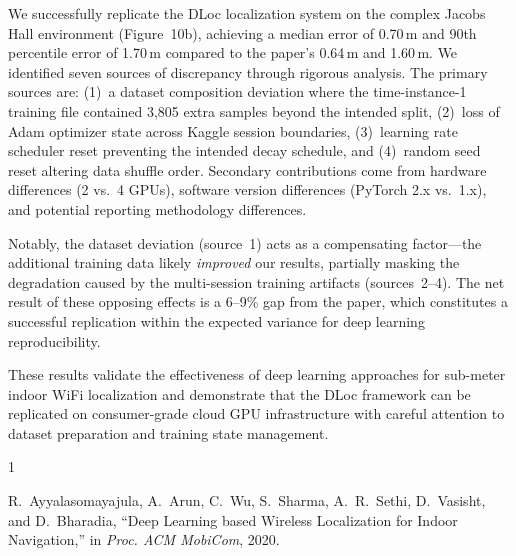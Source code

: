 \documentclass[12pt,a4paper]{article}
\begin{document}
We successfully replicate the DLoc localization system on the complex Jacobs Hall environment (Figure~10b), achieving a median error of 0.70\,m and 90th percentile error of 1.70\,m compared to the paper's 0.64\,m and 1.60\,m. We identified seven sources of discrepancy through rigorous analysis. The primary sources are: (1)~a dataset composition deviation where the time-instance-1 training file contained 3{,}805 extra samples beyond the intended split, (2)~loss of Adam optimizer state across Kaggle session boundaries, (3)~learning rate scheduler reset preventing the intended decay schedule, and (4)~random seed reset altering data shuffle order. Secondary contributions come from hardware differences (2 vs.\ 4 GPUs), software version differences (PyTorch 2.x vs.\ 1.x), and potential reporting methodology differences.

Notably, the dataset deviation (source~1) acts as a compensating factor---the additional training data likely \emph{improved} our results, partially masking the degradation caused by the multi-session training artifacts (sources~2--4). The net result of these opposing effects is a 6--9\% gap from the paper, which constitutes a successful replication within the expected variance for deep learning reproducibility.

These results validate the effectiveness of deep learning approaches for sub-meter indoor WiFi localization and demonstrate that the DLoc framework can be replicated on consumer-grade cloud GPU infrastructure with careful attention to dataset preparation and training state management.

\begin{thebibliography}{1}

R.~Ayyalasomayajula, A.~Arun, C.~Wu, S.~Sharma, A.~R.~Sethi, D.~Vasisht, and D.~Bharadia,
``Deep Learning based Wireless Localization for Indoor Navigation,''
in \emph{Proc. ACM MobiCom}, 2020.

\end{thebibliography}
\end{document}

